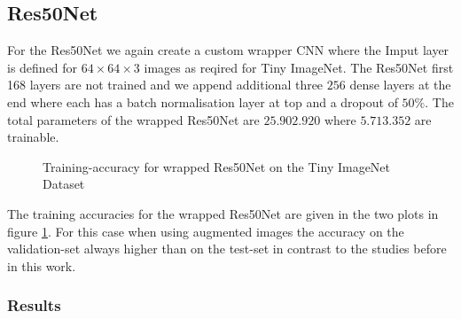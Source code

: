 \documentclass[11pt]{article}
\begin{document}
\subsection{Res50Net}
For the Res50Net we again create a custom wrapper CNN where the Imput layer is defined for $64\times64\times 3$ images as reqired for Tiny ImageNet. The Res50Net first 168 layers are not trained and we append additional three $256$ dense layers at the end where each has a batch normalisation layer at top and a dropout of $50\%$. The total parameters of the wrapped Res50Net are $25.902.920$ where $5.713.352$ are trainable.

\begin{figure}
\centering
{}
  \hfill
  \hfill
\caption{Training-accuracy for wrapped Res50Net on the Tiny ImageNet Dataset}
\label{rescnn::8}
\end{figure}

The training accuracies for the wrapped Res50Net are given in the two plots in figure \ref{rescnn::8}. For this case when using augmented images the accuracy on the validation-set always higher than on the test-set in contrast to the studies before in this work.


\subsubsection{Results}

  
\end{document}
